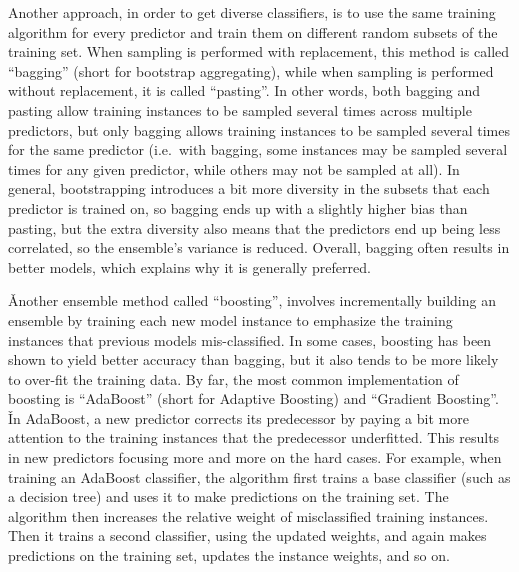 Another approach, in order to get diverse classifiers, is to use the same training algorithm for every predictor and
train them on different random subsets of the training set. When sampling is performed with replacement, this method
is called ``bagging'' (short for bootstrap aggregating), while when sampling is performed without replacement, it is
called ``pasting''. In other words, both bagging and pasting allow training instances to be sampled several times
across multiple predictors, but only bagging allows training instances to be sampled several times for the same
predictor (i.e.\ with bagging, some instances may be sampled several times for any given predictor, while others may
not be sampled at all). In general, bootstrapping introduces a bit more diversity in the subsets that each predictor
is trained on, so bagging ends up with a slightly higher bias than pasting, but the extra diversity also means that
the predictors end up being less correlated, so the ensemble's variance is reduced. Overall, bagging often results in
better models, which explains why it is generally preferred.

\vspace{7pt}


\v

Another ensemble method called ``boosting'', involves incrementally building an ensemble by training each new model
instance to emphasize the training instances that previous models mis-classified. In some cases, boosting has been
shown to yield better accuracy than bagging, but it also tends to be more likely to over-fit the training data. By
far, the most common implementation of boosting is ``AdaBoost'' (short for Adaptive Boosting) and ``Gradient Boosting''.
\v

In AdaBoost, a new predictor corrects its predecessor by paying a bit more attention to the training instances that
the predecessor underfitted. This results in new predictors focusing more and more on the hard cases. For example,
when training an AdaBoost classifier, the algorithm first trains a base classifier (such as a decision tree) and uses
it to make predictions on the training set. The algorithm then increases the relative weight of misclassified
training instances. Then it trains a second classifier, using the updated weights, and again makes predictions on the
training set, updates the instance weights, and so on.

\vspace{7pt}

